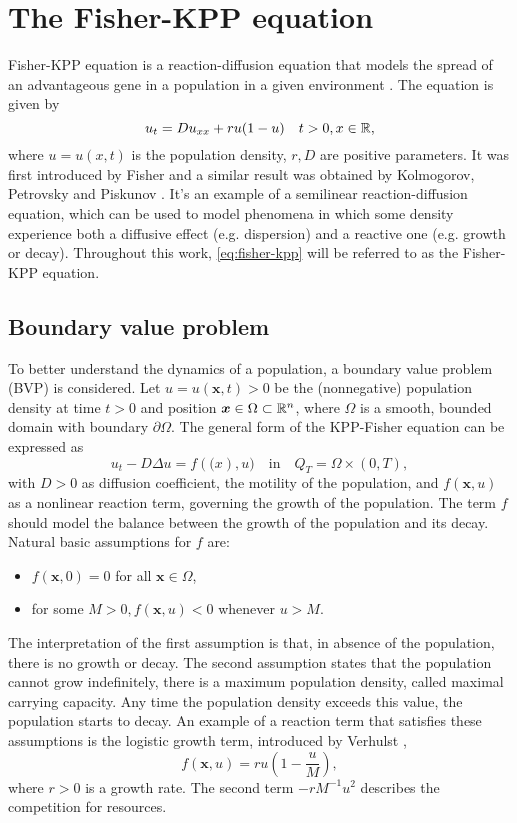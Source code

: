 \section{The Fisher-KPP equation}
Fisher-KPP equation is a reaction-diffusion equation that models the spread of an advantageous gene in a population in a given environment \cite{SalsaVerziniPDE}. The equation is given by
\begin{equation}
    u_t = Du_{xx} + ru(1-u) \quad t > 0, x \in \mathbb{R},
    \label{eq:fisher-kpp}
\end{equation}
where $u = u(x, t)$ is the population density, $r, D$ are positive parameters. It was first introduced by Fisher \cite{Fisher1937} and a similar result was obtained by Kolmogorov, Petrovsky and Piskunov \cite{KPP1937}. It's an example of a semilinear reaction-diffusion equation, which can be used to model phenomena in which some density experience both a diffusive effect (e.g. dispersion) and a reactive one (e.g. growth or decay). Throughout this work, \eqref{eq:fisher-kpp} will be referred to as the Fisher-KPP equation.

\subsection{Boundary value problem}
To better understand the dynamics of a population, a boundary value problem (BVP) is considered. Let \(u = u(\bm{x}, t) > 0\) be the (nonnegative) population density at time \(t > 0\) and position \(\bm{x} \in \Omega \subset \mathbb{R}^n\), where \(\Omega\) is a smooth, bounded domain with boundary \(\partial \Omega\). 
The general form of the KPP-Fisher equation can be expressed as 
\begin{equation}
    u_t - D \Delta u = f(\bm(x), u) \quad \text{in} \quad Q_T = \Omega \times (0, T),
    \label{eq:fisher-kpp-general}
\end{equation}
with \(D > 0\) as diffusion coefficient, the motility of the population, and \(f(\bm{x}, u)\) as a nonlinear reaction term, governing the growth of the population. The term \(f\) should model the balance between the growth of the population and its decay. Natural basic assumptions for \(f\) are:
\begin{itemize}
    \item \(f(\bm{x}, 0) = 0\) for all \(\bm{x} \in \Omega\),
    \item for some \(M > 0, f(\bm{x}, u) < 0\) whenever \(u > M\).
\end{itemize}
The interpretation of the first assumption is that, in absence of the population, there is no growth or decay. The second assumption states that the population cannot grow indefinitely, there is a maximum population density, called maximal carrying capacity. Any time the population density exceeds this value, the population starts to decay. An example of a reaction term that satisfies these assumptions is the logistic growth term, introduced by Verhulst \cite{Verhulst1847}, 
\begin{equation}
    f(\bm{x}, u) = ru(1 - \frac{u}{M}), 
\end{equation}
where \(r > 0\) is a growth rate. The second term \(-rM^{-1}u^2\) describes the competition for resources.

